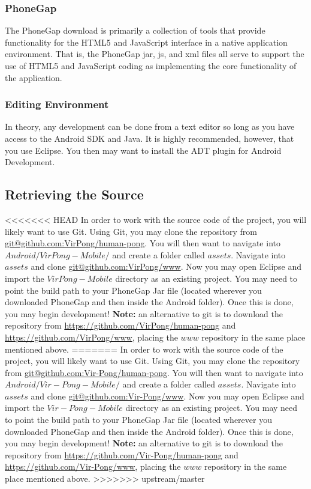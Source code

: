 \documentclass[12pt]{article}
\newenvironment{itemize*}%
  {\begin{itemize}%
  	\setlength{\parsep}{0pt}
    \setlength{\itemsep}{0pt}%
    \setlength{\parskip}{0pt}}%
  {\end{itemize}}
\begin{document}
\begin{itemize*}
\subsubsection{PhoneGap}
The PhoneGap download is primarily a collection of tools that provide functionality for the HTML5 and JavaScript interface in a native application environment.  That is, the PhoneGap jar, js, and xml files all serve to support the use of HTML5 and JavaScript coding as implementing the core functionality of the application.   

\subsubsection{Editing Environment}
In theory, any development can be done from a text editor so long as you have access to the Android SDK and Java.  It is highly recommended, however, that you use Eclipse\cite{Eclipse-Helios}.  You then may want to install the ADT plugin for Android Development\cite{Eclipse-ADT}.

\subsection{Retrieving the Source}
<<<<<<< HEAD
In order to work with the source code of the project, you will likely want to use Git\cite{Github}.  Using Git, you may clone the repository from \url{git@github.com:VirPong/human-pong}.  You will then want to navigate into $Android/VirPong-Mobile/$ and create a folder called $assets$.  Navigate into $assets$ and clone \url{git@github.com:VirPong/www}.  Now you may open Eclipse and import the $VirPong-Mobile$ directory as an existing project.  You may need to point the build path to your PhoneGap Jar file (located wherever you downloaded PhoneGap and then inside the Android folder).  Once this is done, you may begin development!  \textbf{Note:} an alternative to git is to download the repository from \url{https://github.com/VirPong/human-pong} and \url{https://github.com/VirPong/www}, placing the $www$ repository in the same place mentioned above.
=======
In order to work with the source code of the project, you will likely want to use Git\cite{Github}.  Using Git, you may clone the repository from \url{git@github.com:Vir-Pong/human-pong}.  You will then want to navigate into $Android/Vir-Pong-Mobile/$ and create a folder called $assets$.  Navigate into $assets$ and clone \url{git@github.com:Vir-Pong/www}.  Now you may open Eclipse and import the $Vir-Pong-Mobile$ directory as an existing project.  You may need to point the build path to your PhoneGap Jar file (located wherever you downloaded PhoneGap and then inside the Android folder).  Once this is done, you may begin development!  \textbf{Note:} an alternative to git is to download the repository from \url{https://github.com/Vir-Pong/human-pong} and \url{https://github.com/Vir-Pong/www}, placing the $www$ repository in the same place mentioned above.
>>>>>>> upstream/master




\end{itemize*}
\end{document}
